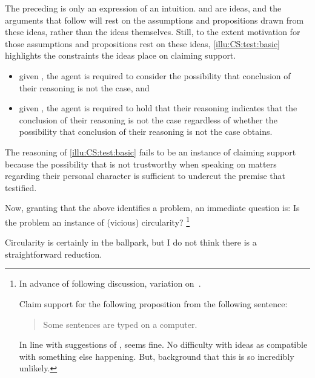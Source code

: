 \begin{note}
  The preceding is only an expression of an intuition.
  \ideaS{} and \ideaCS{} are ideas, and the arguments that follow will rest on the assumptions and propositions drawn from these ideas, rather than the ideas themselves.
  Still, to the extent motivation for those assumptions and propositions rest on these ideas, \autoref{illu:CS:test:basic} highlights the constraints the ideas place on claiming support.

  \begin{itemize}
  \item given \ideaS{}, the agent is required to consider the possibility that conclusion of their reasoning is not the case, and
  \item given \ideaCS{}, the agent is required to hold that their reasoning indicates that the conclusion of their reasoning is not the case regardless of whether the possibility that conclusion of their reasoning is not the case obtains.
  \end{itemize}
  The reasoning of \autoref{illu:CS:test:basic} fails to be an instance of claiming support because the possibility that  is not trustworthy when speaking on matters regarding their personal character is sufficient to undercut the premise that  testified.
\end{note}

\begin{note}
  Now, granting that the above identifies a problem, an immediate question is:
  Is the problem an instance of (vicious) circularity?\nolinebreak
  \footnote{
    In advance of following discussion, variation on~\textcite{Sorensen:1991wh}.

    Claim support for the following proposition from the following sentence:

    \begin{quote}
      Some sentences are typed on a computer.
    \end{quote}

    In line with suggestions of \citeauthor{Sorensen:1991wh}, seems fine.
    No difficulty with ideas as compatible with something else happening.
    But, background that this is so incredibly unlikely.
  }

  Circularity is certainly in the ballpark, but I do not think there is a straightforward reduction.
\end{note}

